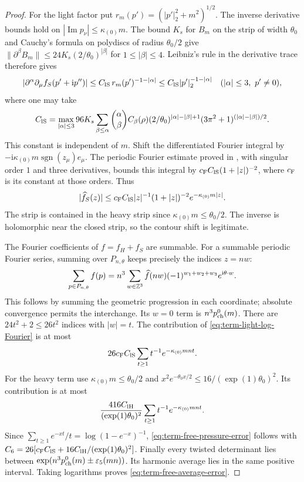 \begin{proof}
For the light factor put $r_m(p')=(|p'|_2^2+m^2)^{1/2}$.
The inverse derivative bounds
\cite[(15)]{FermionBlock} hold on
$|\operatorname{Im}p_\nu|\le\kappa_{(0)}m$.
The bound $K_s$ for $B_m$ on the strip of width $\theta_0$
and Cauchy's formula on polydiscs of radius $\theta_0/2$
give
$\|\partial^\beta B_m\|
\le24K_s(2/\theta_0)^{|\beta|}$ for $1\le|\beta|\le4$.
Leibniz's rule in the derivative trace therefore gives
\begin{equation}\label{eq:term-light-log-derivatives}
 |\partial^\alpha\partial_\mu f_S(p'+\mathrm ip'')|
 \le C_{\rm lS}\,r_m(p')^{-1-|\alpha|}
 \le C_{\rm lS}|p'|_2^{-1-|\alpha|}
       \quad(|\alpha|\le3,\ p'\ne0),
\end{equation}
where one may take
\[
 C_{\rm lS}
 =\max_{|\alpha|\le3}96K_s
   \sum_{\beta\le\alpha}
    \binom{\alpha}{\beta}C_\beta(\rho)
    (2/\theta_0)^{|\alpha|-|\beta|+1}
    (3\pi^2+1)^{(|\alpha|-|\beta|)/2}.
\]
This constant is independent of $m$.
Shift the differentiated Fourier integral by
$-\mathrm i\kappa_{(0)}m\operatorname{sgn}(z_\mu)e_\mu$.
The periodic Fourier estimate proved in
\cite[Proposition~2.3]{FermionBlock}, with singular
order $1$ and three derivatives, bounds this integral by
$c_{\rm F}C_{\rm lS}(1+|z|)^{-2}$, where $c_{\rm F}$
is its constant at those orders. Thus
\begin{equation}\label{eq:term-light-log-Fourier}
 |\widehat f_S(z)|
    \le c_{\rm F}C_{\rm lS}|z|^{-1}(1+|z|)^{-2}
                          e^{-\kappa_{(0)}m|z|}.
\end{equation}
The strip is contained in the heavy strip since
$\kappa_{(0)}m\le\theta_0/2$.
The inverse is holomorphic near the closed strip, so
the contour shift is legitimate.

The Fourier coefficients of $f=f_H+f_S$ are summable.
For a summable periodic Fourier series, summing over
$P_{n,\theta}$ keeps precisely the indices $z=nw$:
\begin{equation}\label{eq:term-Fourier-sampling}
 \sum_{p\in P_{n,\theta}}f(p)
 =n^3\sum_{w\in\mathbb Z^3}\widehat f(nw)
                       (-1)^{w_1+w_2+w_3}e^{\mathrm i\theta\cdot w}.
\end{equation}
This follows by summing the geometric progression in each
coordinate; absolute convergence permits the interchange.
Its $w=0$ term is $n^3p_{\rm ch}^0(m)$.
There are $24t^2+2\le26t^2$ indices with $|w|=t$.
The contribution of \eqref{eq:term-light-log-Fourier} is at most
\[
 26c_{\rm F}C_{\rm lS}
                  \sum_{t\ge1}t^{-1}e^{-\kappa_{(0)}mnt}.
\]
For the heavy term use
$\kappa_{(0)}m\le\theta_0/2$ and
$x^2e^{-\theta_0x/2}\le16/(\exp(1)\theta_0)^2$.
Its contribution is at most
\[
 \frac{416C_{\rm lH}}{(\exp(1)\theta_0)^2}
                     \sum_{t\ge1}t^{-1}e^{-\kappa_{(0)}mnt}.
\]
Since $\sum_{t\ge1}e^{-xt}/t=\log(1-e^{-x})^{-1}$,
\eqref{eq:term-free-pressure-error} follows with
$C_6=26[c_{\rm F}C_{\rm lS}
          +16C_{\rm lH}/(\exp(1)\theta_0)^2]$.
Finally every twisted determinant lies between
$\exp(n^3p_{\rm ch}^0(m)\pm\varepsilon_5(mn))$.
Its harmonic average lies in the same positive interval.
Taking logarithms proves \eqref{eq:term-free-average-error}.
\end{proof}

